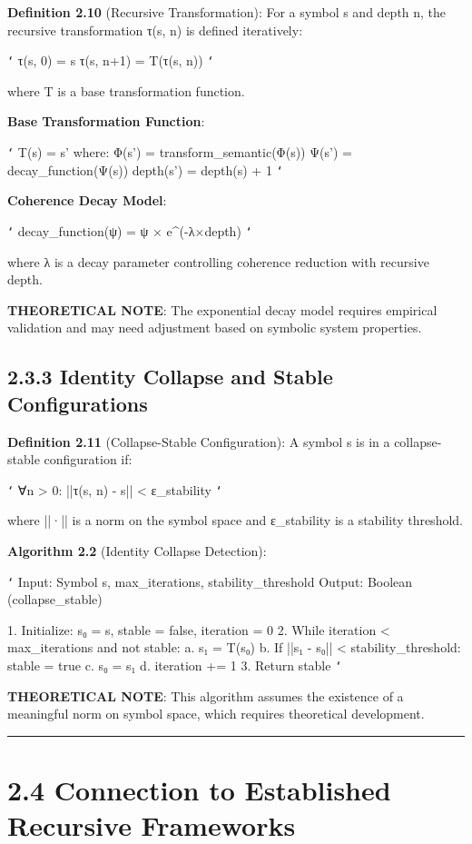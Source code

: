 \textbf{Definition 2.10} (Recursive Transformation): For a symbol s and depth n, the recursive transformation τ(s, n) is defined iteratively:

\texttt{`}
τ(s, 0) = s
τ(s, n+1) = T(τ(s, n))
\texttt{`}

where T is a base transformation function.

\textbf{Base Transformation Function}:

\texttt{`}
T(s) = s' where:
Φ(s') = transform_semantic(Φ(s))
Ψ(s') = decay_function(Ψ(s))
depth(s') = depth(s) + 1
\texttt{`}

\textbf{Coherence Decay Model}:

\texttt{`}
decay_function(ψ) = ψ × e^(-λ×depth)
\texttt{`}

where λ is a decay parameter controlling coherence reduction with recursive depth.

\textbf{THEORETICAL NOTE}: The exponential decay model requires empirical validation and may need adjustment based on symbolic system properties.

\subsection{2.3.3 Identity Collapse and Stable Configurations}

\textbf{Definition 2.11} (Collapse-Stable Configuration): A symbol s is in a collapse-stable configuration if:

\texttt{`}
∀n > 0: ||τ(s, n) - s|| < ε_stability
\texttt{`}

where ||·|| is a norm on the symbol space and ε_stability is a stability threshold.

\textbf{Algorithm 2.2} (Identity Collapse Detection):

\texttt{`}
Input: Symbol s, max_iterations, stability_threshold
Output: Boolean (collapse_stable)

1. Initialize: s₀ = s, stable = false, iteration = 0
2. While iteration < max_iterations and not stable:
   a. s₁ = T(s₀)
   b. If ||s₁ - s₀|| < stability_threshold:
      stable = true
   c. s₀ = s₁
   d. iteration += 1
3. Return stable
\texttt{`}

\textbf{THEORETICAL NOTE}: This algorithm assumes the existence of a meaningful norm on symbol space, which requires theoretical development.

\hrule

\section{2.4 Connection to Established Recursive Frameworks}

